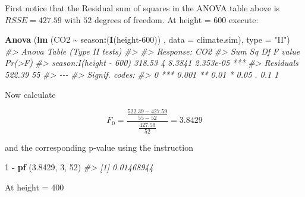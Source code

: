 \documentclass[
]{book}
\newenvironment{Shaded}{\begin{snugshade}}{\end{snugshade}}
\newcommand{\AttributeTok}[1]{\textcolor[rgb]{0.13,0.29,0.53}{#1}}
\newcommand{\CommentTok}[1]{\textcolor[rgb]{0.56,0.35,0.01}{\textit{#1}}}
\newcommand{\DecValTok}[1]{\textcolor[rgb]{0.00,0.00,0.81}{#1}}
\newcommand{\FloatTok}[1]{\textcolor[rgb]{0.00,0.00,0.81}{#1}}
\newcommand{\FunctionTok}[1]{\textcolor[rgb]{0.13,0.29,0.53}{\textbf{#1}}}
\newcommand{\NormalTok}[1]{#1}
\newcommand{\SpecialCharTok}[1]{\textcolor[rgb]{0.81,0.36,0.00}{\textbf{#1}}}
\newcommand{\StringTok}[1]{\textcolor[rgb]{0.31,0.60,0.02}{#1}}
\begin{document}
First notice that the Residual sum of squares in the ANOVA table above is \(RSSE=427.59\) with \(52\) degrees of freedom. At height = 600 execute:

\begin{Shaded}
\begin{Highlighting}[]
\FunctionTok{Anova}\NormalTok{ (}\FunctionTok{lm}\NormalTok{ (CO2 }\SpecialCharTok{\textasciitilde{}}\NormalTok{ season}\SpecialCharTok{:}\NormalTok{(}\FunctionTok{I}\NormalTok{(height}\DecValTok{{-}600}\NormalTok{)) , }\AttributeTok{data =}\NormalTok{ climate.sim), }\AttributeTok{type =} \StringTok{"II"}\NormalTok{)}
\CommentTok{\#\textgreater{} Anova Table (Type II tests)}
\CommentTok{\#\textgreater{} }
\CommentTok{\#\textgreater{} Response: CO2}
\CommentTok{\#\textgreater{}                        Sum Sq Df F value    Pr(\textgreater{}F)    }
\CommentTok{\#\textgreater{} season:I(height {-} 600) 318.53  4  8.3841 2.353e{-}05 ***}
\CommentTok{\#\textgreater{} Residuals              522.39 55                      }
\CommentTok{\#\textgreater{} {-}{-}{-}}
\CommentTok{\#\textgreater{} Signif. codes:  }
\CommentTok{\#\textgreater{} 0 \textquotesingle{}***\textquotesingle{} 0.001 \textquotesingle{}**\textquotesingle{} 0.01 \textquotesingle{}*\textquotesingle{} 0.05 \textquotesingle{}.\textquotesingle{} 0.1 \textquotesingle{} \textquotesingle{} 1}
\end{Highlighting}
\end{Shaded}

Now calculate

\[
F_0 = \frac{\frac{522.39 - 427.59}{55-52}}{\frac{427.59}{52}} = 3.8429
\]

and the corresponding p-value using the instruction

\begin{Shaded}
\begin{Highlighting}[]
\DecValTok{1} \SpecialCharTok{{-}} \FunctionTok{pf}\NormalTok{ (}\FloatTok{3.8429}\NormalTok{, }\DecValTok{3}\NormalTok{, }\DecValTok{52}\NormalTok{)}
\CommentTok{\#\textgreater{} [1] 0.01468944}
\end{Highlighting}
\end{Shaded}

At height = 400
\end{document}
